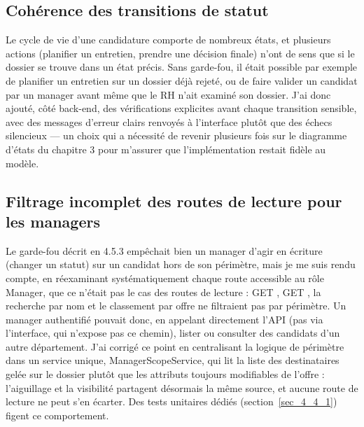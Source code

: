 \subsection{Cohérence des transitions de statut}
\label{sec_4_5_3}
Le cycle de vie d’une candidature comporte de nombreux états, et plusieurs actions (planifier un entretien, prendre une décision finale) n’ont de sens que si le dossier se trouve dans un état précis. Sans garde-fou, il était possible par exemple de planifier un entretien sur un dossier déjà rejeté, ou de faire valider un candidat par un manager avant même que le RH n’ait examiné son dossier. J’ai donc ajouté, côté back-end, des vérifications explicites avant chaque transition sensible, avec des messages d’erreur clairs renvoyés à l’interface plutôt que des échecs silencieux — un choix qui a nécessité de revenir plusieurs fois sur le diagramme d’états du chapitre 3 pour m’assurer que l’implémentation restait fidèle au modèle.

\subsection{Filtrage incomplet des routes de lecture pour les managers}
\label{sec_4_5_4}
Le garde-fou décrit en 4.5.3 empêchait bien un manager d’agir en écriture (changer un statut) sur un candidat hors de son périmètre, mais je me suis rendu compte, en réexaminant systématiquement chaque route accessible au rôle Manager, que ce n’était pas le cas des routes de lecture : GET , GET , la recherche par nom et le classement par offre ne filtraient pas par périmètre. Un manager authentifié pouvait donc, en appelant directement l’API (pas via l’interface, qui n’expose pas ce chemin), lister ou consulter des candidats d’un autre département. J’ai corrigé ce point en centralisant la logique de périmètre dans un service unique, Manager\-Scope\-Service, qui lit la liste des destinataires gelée sur le dossier plutôt que les attributs toujours modifiables de l’offre : l’aiguillage et la visibilité partagent désormais la même source, et aucune route de lecture ne peut s’en écarter. Des tests unitaires dédiés (section~\ref{sec_4_4_1}) figent ce comportement.

